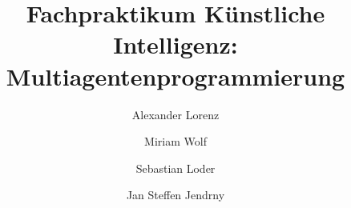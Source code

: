 \documentclass[runningheads]{llncs}
\begin{document}
%
\title{Fachpraktikum Künstliche Intelligenz: Multiagentenprogrammierung}
%
%
\author{Alexander Lorenz \and
Miriam Wolf \and
Sebastian Loder \and
Jan Steffen Jendrny}
%
%
%
\maketitle              %
%
%
%
%
%










%
%
%
% 
% 
%

\end{document}
